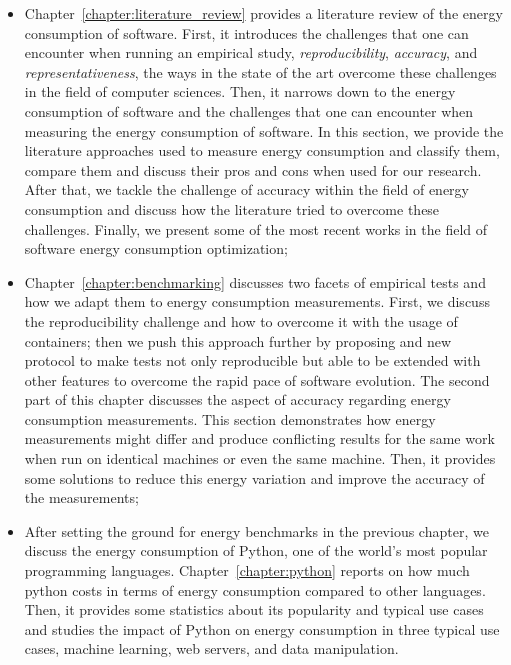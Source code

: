 \begin{itemize}
      \item Chapter~\ref{chapter:literature_review} provides a literature review of the energy consumption of software.
            First, it introduces the challenges that one can encounter when running an empirical study, \emph{reproducibility}, \emph{accuracy}, and \emph{representativeness}, the ways in the state of the art overcome these challenges in the field of computer sciences.
            Then, it narrows down to the energy consumption of software and the challenges that one can encounter when measuring the energy consumption of software.
            In this section, we provide the literature approaches used to measure energy consumption and classify them, compare them and discuss their pros and cons when used for our research. After that, we tackle the challenge of accuracy within the field of energy consumption and discuss how the literature tried to overcome these challenges. Finally, we  present some of the most recent works in the field of software energy consumption optimization;
      \item Chapter~\ref{chapter:benchmarking} discusses two facets of empirical tests and how we adapt them to energy consumption measurements.
            First, we discuss the reproducibility challenge and how to overcome it with the usage of containers; then we push this approach further by proposing and new protocol to make tests not only reproducible but able to be extended with other features to overcome the rapid pace of software evolution.
            The second part of this chapter discusses the aspect of accuracy regarding energy consumption measurements.
            This section demonstrates how energy measurements might differ and produce conflicting results for the same work when run on identical machines or even the same machine.
            Then, it provides some solutions to reduce this energy variation and improve the accuracy of the measurements;
      \item After setting the ground for energy benchmarks in the previous chapter, we discuss the energy consumption of Python, one of the world's most popular programming languages.
            Chapter~\ref{chapter:python} reports on how much python costs in terms of energy consumption compared to other languages.
            Then, it provides some statistics about its popularity and typical use cases and studies the impact of Python on energy consumption in three typical use cases, machine learning, web servers, and data manipulation.

\end{itemize}
